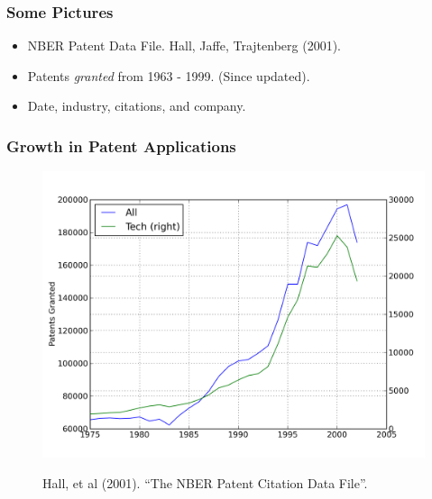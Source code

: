 \documentclass{beamer}
\begin{document}

\begin{frame}[t]\frametitle{Some Pictures}
    
\begin{itemize}\vspace{15mm}
  \item NBER Patent Data File. Hall, Jaffe, Trajtenberg (2001).
  \vspace{2mm}
  \item Patents \emph{granted} from 1963 - 1999. (Since updated).
  \vspace{2mm}
  \item Date, industry, citations, and company.
\end{itemize}

\end{frame}

\begin{frame}[t]\frametitle{Growth in Patent Applications} 
\fontsize{6pt}{7.2}\selectfont
\!\!\!\!\!\!\!\!\!\!\!\!\!\!
\begin{figure}[hb]
  \begin{center}
      \includegraphics[scale=.5]{tech_and_all.png}
      \label{fig:app_year}
  \end{center}
  \!\!\!\!\!
  Hall, et al (2001). ``The NBER Patent Citation Data File''.
\end{figure}
\end{frame}
\end{document}

